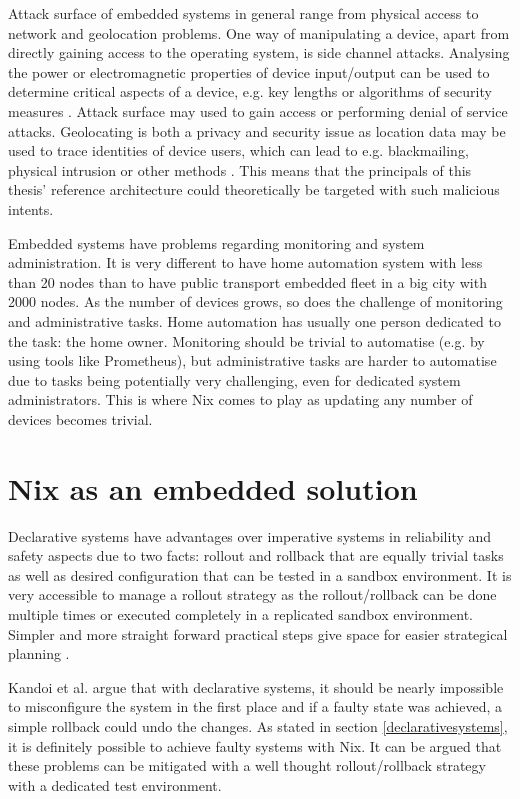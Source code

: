 Attack surface of embedded systems in general range from physical
access to network and geolocation problems. One way of manipulating a
device, apart from directly gaining access to the operating system,
is side channel attacks. Analysing the power or electromagnetic
properties of device input/output can be used to determine critical
aspects of a device, e.g. key lengths or algorithms of security
measures \cite{fysarakis2014embedded, serpanos2013security}. Attack
surface may used to gain access or performing denial of service
attacks. Geolocating is both a privacy and security issue as location
data may be used to trace identities of device users, which can lead
to e.g. blackmailing, physical intrusion or other methods 
\cite{fysarakis2014embedded}. This means that the principals of this
thesis' reference architecture could theoretically be targeted with such malicious
intents.

Embedded systems have problems regarding monitoring and system
administration. It is very different to have home automation system
with less than 20 nodes than to have public transport embedded fleet
in a big city with 2000 nodes. As the number of devices grows, so does
the challenge of monitoring and administrative tasks. Home automation
has usually one person dedicated to the task: the home owner. Monitoring should be trivial to automatise (e.g. by using
tools like Prometheus), but administrative tasks are harder to
automatise due to tasks being potentially very challenging, even for
dedicated system administrators. This is where Nix comes to play as
updating any number of devices becomes trivial.


\section{Nix as an embedded solution} \label{nixosassolution}

Declarative systems have advantages over imperative systems in
reliability and safety aspects due to two facts: rollout and rollback
that are equally trivial tasks as well as desired configuration that can be tested in a
sandbox environment. It is very accessible to manage a rollout strategy
as the rollout/rollback can be done multiple times or executed
completely in a replicated sandbox environment. Simpler and more straight forward practical steps give space for
easier strategical planning \cite{kandoi2021operating}.

Kandoi et al. \cite{kandoi2021operating} argue that with declarative systems, it should be nearly
impossible to misconfigure the system in the first place and if a faulty
state was achieved, a simple rollback could undo the changes. As stated in section \ref{declarativesystems}, it is definitely possible to achieve
faulty systems with Nix. It can be argued that these problems can be mitigated
with a well thought rollout/rollback strategy with a dedicated test environment.

